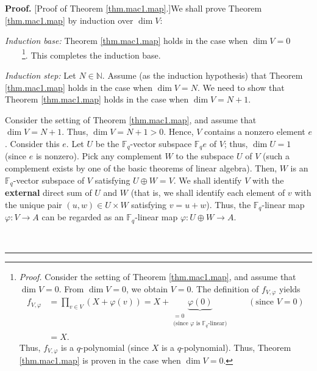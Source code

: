 \documentclass[numbers=enddot,12pt,final,onecolumn,notitlepage]{scrartcl}%
\theoremstyle{definition}
\newenvironment{proof}[1][Proof]{\noindent\textbf{#1.} }{\ \rule{0.5em}{0.5em}}
\let\prodnonlimits\prod
\renewcommand{\prod}{\prodnonlimits\limits}
\begin{document}
\begin{proof}
[Proof of Theorem \ref{thm.mac1.map}.]We shall prove Theorem
\ref{thm.mac1.map} by induction over $\dim V$:

\textit{Induction base:} Theorem \ref{thm.mac1.map} holds in the case when
$\dim V=0$\ \ \ \ \footnote{\textit{Proof.} Consider the setting of Theorem
\ref{thm.mac1.map}, and assume that $\dim V=0$. From $\dim V=0$, we obtain
$V=0$. The definition of $f_{V,\varphi}$ yields%
\begin{align*}
f_{V,\varphi}  &  =\prod_{v\in V}\left(  X+\varphi\left(  v\right)  \right)
=X+\underbrace{\varphi\left(  0\right)  }_{\substack{=0\\\text{(since }%
\varphi\text{ is }\mathbb{F}_{q}\text{-linear)}}}\ \ \ \ \ \ \ \ \ \ \left(
\text{since }V=0\right) \\
&  =X.
\end{align*}
Thus, $f_{V,\varphi}$ is a $q$-polynomial (since $X$ is a $q$-polynomial).
Thus, Theorem \ref{thm.mac1.map} is proven in the case when $\dim V=0$.}. This
completes the induction base.

\textit{Induction step:} Let $N\in\mathbb{N}$. Assume (as the induction
hypothesis) that Theorem \ref{thm.mac1.map} holds in the case when $\dim V=N$.
We need to show that Theorem \ref{thm.mac1.map} holds in the case when $\dim
V=N+1$.

Consider the setting of Theorem \ref{thm.mac1.map}, and assume that $\dim
V=N+1$. Thus, $\dim V=N+1>0$. Hence, $V$ contains a nonzero element $e$.
Consider this $e$. Let $U$ be the $\mathbb{F}_{q}$-vector subspace
$\mathbb{F}_{q}e$ of $V$; thus, $\dim U=1$ (since $e$ is nonzero). Pick any
complement $W$ to the subspace $U$ of $V$ (such a complement exists by one of
the basic theorems of linear algebra). Then, $W$ is an $\mathbb{F}_{q}$-vector
subspace of $V$ satisfying $U\oplus W=V$. We shall identify $V$ with the
\textbf{external} direct sum of $U$ and $W$ (that is, we shall identify each
element of $v$ with the unique pair $\left(  u,w\right)  \in U\times W$
satisfying $v=u+w$). Thus, the $\mathbb{F}_{q}$-linear map $\varphi
:V\rightarrow A$ can be regarded as an $\mathbb{F}_{q}$-linear map
$\varphi:U\oplus W\rightarrow A$.


\end{proof}
\end{document}
